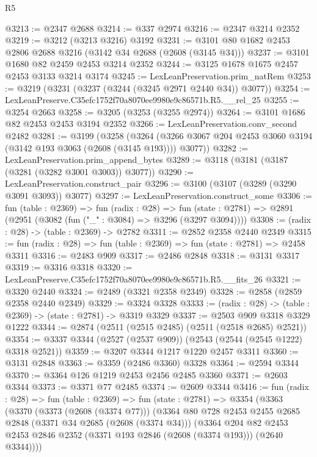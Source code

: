 \begin{lexlean}{R5}
\begin{coremodule}
@3213 := @2347 @2688
@3214 := @337 @2974
@3216 := @2347 @3214 @2352
@3219 := @3212 (@3213 @3216) @3192
@3231 := @3101 @80 @1682 @2453 @2806 @2688 @3216 (@3142 @34 @2688 (@2608 (@3145 @34)))
@3237 := @3101 @1680 @82 @2459 @2453 @3214 @2352
@3244 := @3125 @1678 @1675 @2457 @2453 @3133 @3214 @3174
@3245 := LexLeanPreservation.prim_natRem
@3253 := @3219 (@3231 (@3237 (@3244 (@3245 @2971 @2440 @34)) @3077))
@3254 := LexLeanPreserve.C35efc1752f70a8070ee9980e9c86571b.R5.__rel_25
@3255 := @3254 @2663
@3258 := @3205 (@3253 (@3255 @2974))
@3264 := @3101 @1686 @82 @2453 @2453 @3194 @2352
@3266 := LexLeanPreservation.conv_second @2482
@3281 := @3199
    (@3258
      (@3264 (@3266 @3067 @204 @2453 @3060 @3194 (@3142 @193 @3063 (@2608 (@3145 @193)))) @3077))
@3282 := LexLeanPreservation.prim_append_bytes
@3289 := @3118 (@3181 (@3187 (@3281 (@3282 @3001 @3003)) @3077))
@3290 := LexLeanPreservation.construct_pair
@3296 := @3100 (@3107 (@3289 (@3290 @3091 @3093)) @3077)
@3297 := LexLeanPreservation.construct_some
@3306 := fun (table : @2369) =>
  fun (radix : @28) =>
  fun (state : @2781) => @2891 (@2951 (@3082 (fun ("_" : @3084) => @3296 (@3297 @3094))))
@3308 := (radix : @28) -> (table : @2369) -> @2782
@3311 := @2852 @2358 @2440 @2349
@3315 := fun (radix : @28) => fun (table : @2369) => fun (state : @2781) => @2458 @3311
@3316 := @2483 @909
@3317 := @2486 @2848
@3318 := @3131 @3317
@3319 := @3316 @3318
@3320 := LexLeanPreserve.C35efc1752f70a8070ee9980e9c86571b.R5.__fits_26
@3321 := @3320 @2440
@3324 := @2489 (@3321 @2358 @2349)
@3328 := @2858 (@2859 @2358 @2440 @2349)
@3329 := @3324 @3328
@3333 := (radix : @28) -> (table : @2369) -> (state : @2781) -> @3319 @3329
@3337 := @2503 @909 @3318 @3329 @1222
@3344 := @2874 (@2511 (@2515 @2485) (@2511 (@2518 @2685) @2521))
@3354 := @3337 @3344 (@2527 (@2537 @909)) (@2543 (@2544 (@2545 @1222) @3318 @2521))
@3359 := @3207 @3344 @1217 @1220 @2457 @3311
@3360 := @3131 @2848
@3363 := @3359 (@2486 @3360) @3328
@3364 := @2594 @3344
@3370 := @3364 @126 @1219 @2453 @2456 @2485 @3360
@3371 := @2603 @3344
@3373 := @3371 @77 @2485
@3374 := @2609 @3344
@3416 := fun (radix : @28) =>
  fun (table : @2369) =>
  fun (state : @2781) =>
  @3354
    (@3363
      (@3370
        (@3373 (@2608 (@3374 @77)))
        (@3364
          @80
          @728
          @2453
          @2455
          @2685
          @2848
          (@3371 @34 @2685 (@2608 (@3374 @34)))
          (@3364
            @204
            @82
            @2453
            @2453
            @2846
            @2352
            (@3371 @193 @2846 (@2608 (@3374 @193)))
            (@2640 @3344))))

\end{coremodule}
\end{lexlean}
